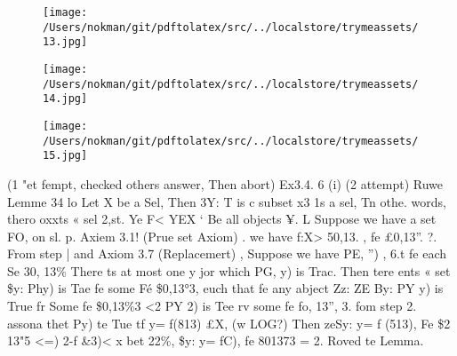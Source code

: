 \documentclass[a4paper,12pt]{article}
\begin{document}
\vspace{10pt}

\par

\vspace{10pt}

\begin{figure}[h]

\texttt{[image: /Users/nokman/git/pdftolatex/src/../localstore/trymeassets/13.jpg]}

\centering

\end{figure}

\par

\vspace{10pt}

\begin{figure}[h]

\texttt{[image: /Users/nokman/git/pdftolatex/src/../localstore/trymeassets/14.jpg]}

\centering

\end{figure}

\par

\vspace{10pt}

\begin{figure}[h]

\texttt{[image: /Users/nokman/git/pdftolatex/src/../localstore/trymeassets/15.jpg]}

\centering

\end{figure}

\par

\vspace{10pt}

    (1 "et fempt, checked others answer, Then abort)  Ex3.4. 6 (i) (2 attempt)   Ruwe Lemme 34 lo  Let X be a Sel, Then 3Y: T is c subset x3 1s a sel,    Tn othe. words, thero oxxts « sel 2,st. Ye F< YEX ‘ Be all objects ¥.    L Suppose we have a set FO, on sl. p. Axiem 3.1! (Prue set Axiom) .  we have f:X> 50,13. , fe £0,13”.    ?. From step | and Axiom 3.7 (Replacemert) , Suppose we have PE, ”) , 6.t fe each Se 30, 13\%  There ts at most one y jor which PG, y) is Trac.    Then tere ents « set \$y: Phy) is Tae fe some Fé \$0,13°3,  euch that fe any abject Zz:    ZE By: PY y) is True fr Some fe \$0,13\%3  <2 PY 2) is Tee rv some fe fo, 13”,    3. fom step 2. assona thet Py) te Tue tf y= f(813) £X, (w LOG?)  Then    zeSy: y= f (513), Fe \$2 13"5 <=) 2-f \&3)< x  bet 22\%, \$y: y= fC), fe 801373 = 2. Roved te Lemma. 
\end{document}
